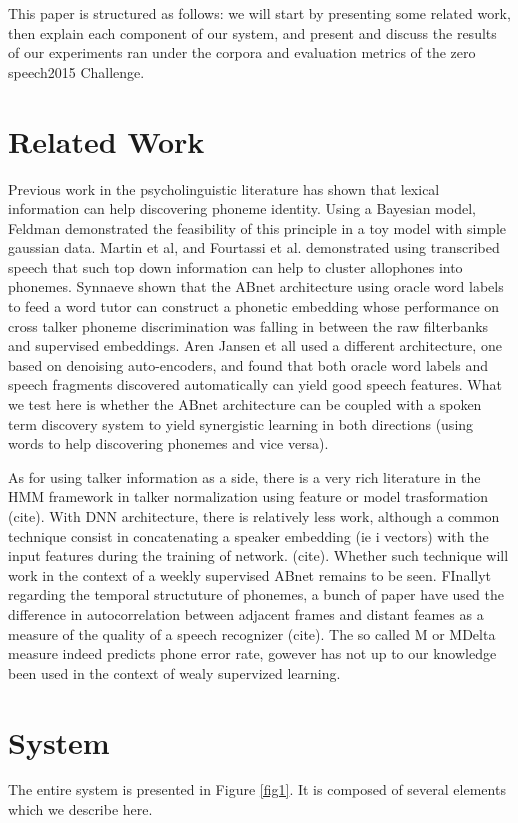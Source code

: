 \documentclass[a4paper]{article}
\begin{document}
This paper is structured as follows: we will start by presenting some related work, then explain each component of our system, and present and discuss the results of our experiments ran under the corpora and evaluation metrics of the zero speech2015 Challenge. 

\section{Related Work}
Previous work in the psycholinguistic literature has shown that lexical information can help discovering phoneme identity. Using a Bayesian model, Feldman demonstrated the feasibility of this principle in a toy model with simple gaussian data. Martin et al, and Fourtassi et al. demonstrated using transcribed speech that such top down information can help to cluster allophones into phonemes. Synnaeve shown that the ABnet architecture using oracle word labels to feed a word tutor can construct a phonetic embedding whose performance on cross talker phoneme discrimination was falling in between the raw filterbanks and supervised embeddings. Aren Jansen et all used a different architecture, one based on denoising auto-encoders, and found that both oracle word labels and speech fragments discovered automatically can yield good speech features.  What we test here is whether the ABnet architecture can be coupled with a spoken term discovery system to yield synergistic learning in both directions (using words to help discovering phonemes and vice versa). 

As for using talker information as a side, there is a very rich literature in the HMM framework in talker normalization using feature or model trasformation (cite). With DNN architecture, there is relatively less work, although a common technique consist in concatenating a speaker embedding (ie i vectors) with the input features during the training of network. (cite). Whether such technique will work in the context of a weekly supervised ABnet remains to be seen. FInallyt regarding the temporal structuture of phonemes, a bunch of paper have used the difference in autocorrelation between adjacent frames and distant feames as a measure of the quality of a speech recognizer (cite). The so called M or MDelta measure indeed predicts phone error rate, gowever has not up to our knowledge been used in the context of wealy supervized learning.

\section{System}
The entire system is presented in Figure \ref{fig1}. It is composed of several elements which we describe here. 
\end{document}
